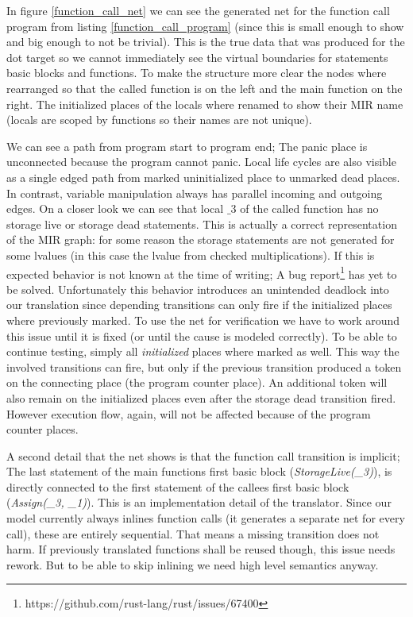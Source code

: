 In figure \ref{function_call_net} we can see the generated net for the function call program from listing \ref{function_call_program} (since this is small enough to show and big enough to not be trivial).
This is the true data that was produced for the dot target so we cannot immediately see the virtual boundaries for statements basic blocks and functions.
To make the structure more clear the nodes where rearranged so that the called function is on the left and the main function on the right.
The initialized places of the locals where renamed to show their MIR name (locals are scoped by functions so their names are not unique).

We can see a path from program start to program end;
The panic place is unconnected because the program cannot panic.
Local life cycles are also visible as a single edged path from marked uninitialized place to unmarked dead places.
In contrast, variable manipulation always has parallel incoming and outgoing edges.
On a closer look we can see that local $\_3$ of the called function has no storage live or storage dead statements.
This is actually a correct representation of the MIR graph:
for some reason the storage statements are not generated for some lvalues (in this case the lvalue from checked multiplications).
If this is expected behavior is not known at the time of writing;
A bug report\footnote{https://github.com/rust-lang/rust/issues/67400} has yet to be solved.
Unfortunately this behavior introduces an unintended deadlock into our translation since depending transitions can only fire if the initialized places where previously marked.
To use the net for verification we have to work around this issue until it is fixed (or until the cause is modeled correctly).
To be able to continue testing, simply all \textit{initialized} places where marked as well.
This way the involved transitions can fire, but only if the previous transition produced a token on the connecting place (the program counter place).
An additional token will also remain on the initialized places even after the storage dead transition fired.
However execution flow, again, will not be affected because of the program counter places.

A second detail that the net shows is that the function call transition is implicit;
The last statement of the main functions first basic block (\textit{StorageLive(\_3)}), is directly connected to the first statement of the callees first basic block (\textit{Assign(\_3, \_1)}).
This is an implementation detail of the translator.
Since our model currently always inlines function calls (it generates a separate net for every call), these are entirely sequential.
That means a missing transition does not harm.
If previously translated functions shall be reused though, this issue needs rework.
But to be able to skip inlining we need high level semantics anyway.

